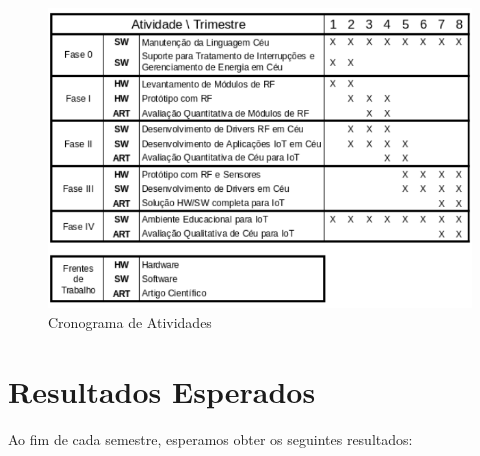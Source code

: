 \documentclass[titlepage,12pt]{article}
\begin{document}
\begin{figure}[t]
\includegraphics[width=\textwidth]{crono}
\caption{ Cronograma de Atividades \label{fig.crono} }
\end{figure}


\section{ Resultados Esperados }

Ao fim de cada semestre, esperamos obter os seguintes resultados:
\end{document}
